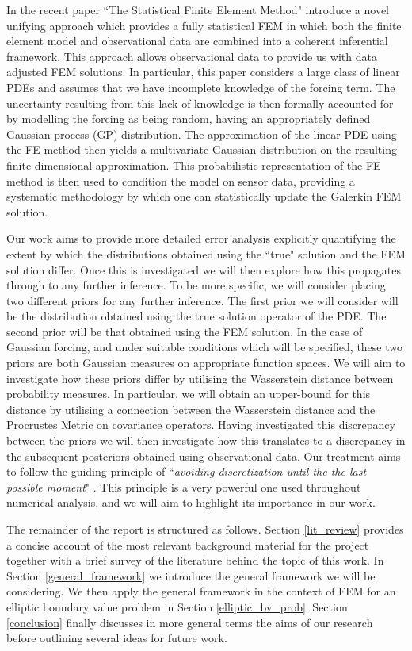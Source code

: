 In the recent paper ``The Statistical Finite Element Method" \textcolor{blue}{\citeauthor{girolami2019statistical}} introduce a novel unifying approach which provides a fully statistical FEM in which both the finite element model and observational data are combined into a coherent inferential framework. This approach allows observational data to provide us with data adjusted FEM solutions. In particular, this paper considers a large class of linear PDEs and assumes that we have incomplete knowledge of the forcing term. The uncertainty resulting from this lack of knowledge is then formally accounted for by modelling the forcing as being random, having an appropriately defined Gaussian process (GP) distribution. The approximation of the linear PDE using the FE method then yields a multivariate Gaussian distribution on the resulting finite dimensional approximation. This probabilistic representation of the FE method is then used to condition the model on sensor data, providing a systematic methodology by which one can statistically update the Galerkin FEM solution.

Our work aims to provide more detailed error analysis explicitly quantifying the extent by which the distributions obtained using the ``true" solution and the FEM solution differ. Once this is investigated we will then explore how this propagates through to any further inference. To be more specific, we will consider placing two different priors for any further inference. The first prior we will consider will be the distribution obtained using the true solution operator of the PDE. The second prior will be that obtained using the FEM solution. In the case of Gaussian forcing, and under suitable conditions which will be specified, these two priors are both Gaussian measures on appropriate function spaces. We will aim to investigate how these priors differ by utilising the Wasserstein distance between probability measures. In particular, we will obtain an upper-bound for this distance by utilising a connection between the Wasserstein distance and the Procrustes Metric on covariance operators. Having investigated this discrepancy between the priors we will then investigate how this translates to a discrepancy in the subsequent posteriors obtained using observational data. Our treatment aims to follow the guiding principle of ``\textit{avoiding discretization until the the last possible moment}" \textcolor{blue}{\cite{stuart2010inverse}}. This principle is a very powerful one used throughout numerical analysis, and we will aim to highlight its importance in our work.

The remainder of the report is structured as follows. Section \textcolor{blue}{\ref{lit_review}} provides a concise account of the most relevant background material for the project together with a brief survey of the literature behind the topic of this work. In Section \textcolor{blue}{\ref{general_framework}} we introduce the general framework we will be considering. We then apply the general framework in the context of FEM for an elliptic boundary value problem in Section \textcolor{blue}{\ref{elliptic_bv_prob}}. Section \textcolor{blue}{\ref{conclusion}} finally discusses in more general terms the aims of our research before outlining several ideas for future work.
